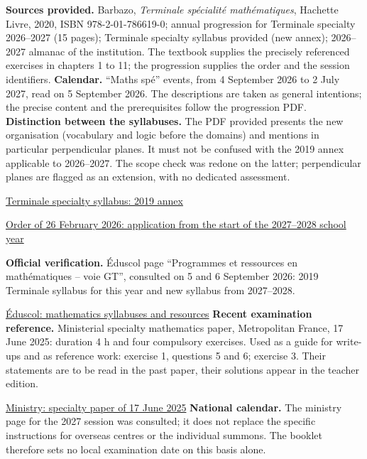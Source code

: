\textbf{Sources provided.} Barbazo, \emph{Terminale spécialité mathématiques}, Hachette Livre, 2020, ISBN 978-2-01-786619-0; annual progression for Terminale specialty 2026--2027 (15 pages); Terminale specialty syllabus provided (new annex); 2026--2027 almanac of the institution. The textbook supplies the precisely referenced exercises in chapters 1 to 11; the progression supplies the order and the session identifiers.
\textbf{Calendar.} ``Maths spé'' events, from 4 September 2026 to 2 July 2027, read on 5 September 2026. The descriptions are taken as general intentions; the precise content and the prerequisites follow the progression PDF.
\textbf{Distinction between the syllabuses.} The PDF provided presents the new organisation (vocabulary and logic before the domains) and mentions in particular perpendicular planes. It must not be confused with the 2019 annex applicable to 2026--2027. The scope check was redone on the latter; perpendicular planes are flagged as an extension, with no dedicated assessment.\par
\href{https://eduscol.education.gouv.fr/sites/default/files/document/spe246annexe1158907pdf-84159.pdf}{Terminale specialty syllabus: 2019 annex}\par
\href{https://www.education.gouv.fr/bo/2026/Hebdo14/MENE2602919A}{Order of 26 February 2026: application from the start of the 2027--2028 school year}\par
\textbf{Official verification.} Éduscol page ``Programmes et ressources en mathématiques -- voie GT'', consulted on 5 and 6 September 2026: 2019 Terminale syllabus for this year and new syllabus from 2027--2028.\par
\href{https://eduscol.education.gouv.fr/5817/programmes-et-ressources-en-mathematiques-voie-gt}{Éduscol: mathematics syllabuses and resources}
\textbf{Recent examination reference.} Ministerial specialty mathematics paper, Metropolitan France, 17 June 2025: duration 4 h and four compulsory exercises. Used as a guide for write-ups and as reference work: exercise 1, questions 5 and 6; exercise 3. Their statements are to be read in the past paper, their solutions appear in the teacher edition.\par
\href{https://www.education.gouv.fr/sites/default/files/2025-06/baccalaur-at-g-n-ral-2025-math-matiques-440856.pdf}{Ministry: specialty paper of 17 June 2025}
\textbf{National calendar.} The ministry page for the 2027 session was consulted; it does not replace the specific instructions for overseas centres or the individual summons. The booklet therefore sets no local examination date on this basis alone.\par
